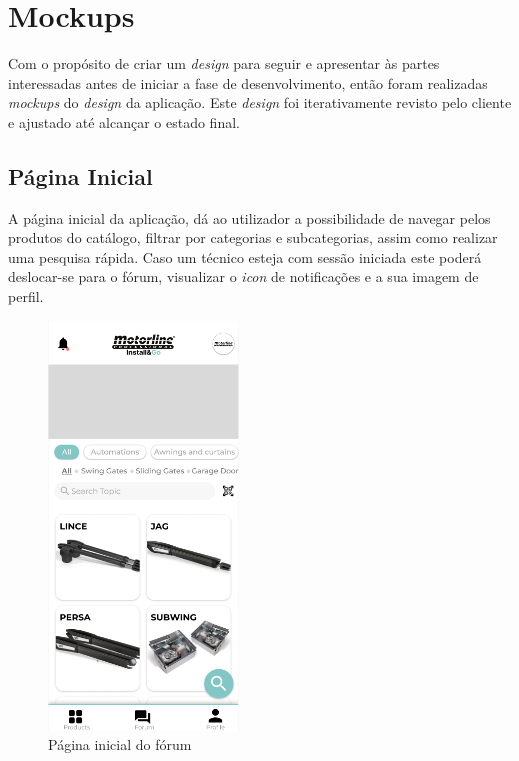 \section{Mockups}
Com o propósito de criar um \textit{design} para seguir e apresentar às partes interessadas antes de iniciar a fase de desenvolvimento, então foram realizadas \textit{mockups} do \textit{design} da aplicação. Este \textit{design} foi iterativamente revisto pelo cliente e ajustado até alcançar o estado final.

\subsection{Página Inicial}

A página inicial da aplicação, dá ao utilizador a possibilidade de navegar pelos produtos do catálogo, filtrar por categorias e subcategorias, assim como realizar uma pesquisa rápida. Caso um técnico esteja com sessão iniciada este poderá deslocar-se para o fórum, visualizar o \textit{icon} de notificações e a sua imagem de perfil.

\begin{figure}[htb]
  \centering
  \includegraphics[width=0.45\textwidth]{images/mockups/home_screen.png}
  \caption{Página inicial do fórum}
  \label{fig:23}
\end{figure}

